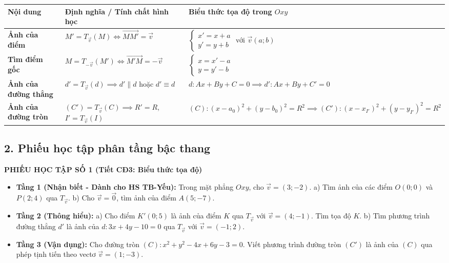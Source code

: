 \documentclass[12pt, a4paper]{article}
\renewcommand{\vec}[1]{\overrightarrow{#1}}
\begin{document}
\begin{center}  
\small  
\begin{tabularx}{\textwidth}{|p{3.2cm}|X|X|}  
\hline  
\textbf{Nội dung} & \textbf{Định nghĩa / Tính chất hình học} & \textbf{Biểu thức tọa độ trong $Oxy$} \\ \hline  
\textbf{Ảnh của điểm} & $M' = T_{\vec{v}}(M) \iff \vec{MM'} = \vec{v}$ & $\begin{cases} x' = x + a \\ y' = y + b \end{cases}$ với $\vec{v}(a; b)$ \\ \hline  
\textbf{Tìm điểm gốc} & $M = T_{-\vec{v}}(M') \iff \vec{M'M} = -\vec{v}$ & $\begin{cases} x = x' - a \\ y = y' - b \end{cases}$ \\ \hline  
\textbf{Ảnh của đường thẳng} & $d' = T_{\vec{v}}(d) \implies d' \parallel d$ hoặc $d' \equiv d$ & $d: Ax + By + C = 0 \implies d': Ax + By + C' = 0$ \\ \hline  
\textbf{Ảnh của đường tròn} & $(C') = T_{\vec{v}}(C) \implies R' = R$, $I' = T_{\vec{v}}(I)$ & $(C): (x-a_0)^2 + (y-b_0)^2 = R^2 \implies (C'): (x-x_{I'})^2 + (y-y_{I'})^2 = R^2$ \\ \hline  
\end{tabularx}  
\end{center}  
  
\subsection*{2. Phiếu học tập phân tầng bậc thang}  
  
\noindent \textbf{PHIẾU HỌC TẬP SỐ 1 (Tiết CĐ3: Biểu thức tọa độ)}  
\begin{itemize}[leftmargin=0.6cm]  
    \item \textbf{Tầng 1 (Nhận biết - Dành cho HS TB-Yếu):}  
    Trong mặt phẳng $Oxy$, cho $\vec{v} = (3; -2)$.  
    a) Tìm ảnh của các điểm $O(0; 0)$ và $P(2; 4)$ qua $T_{\vec{v}}$.  
    b) Cho $\vec{v} = \vec{0}$, tìm ảnh của điểm $A(5; -7)$.  
    \item \textbf{Tầng 2 (Thông hiểu):}  
    a) Cho điểm $K'(0; 5)$ là ảnh của điểm $K$ qua $T_{\vec{v}}$ với $\vec{v} = (4; -1)$. Tìm tọa độ $K$.  
    b) Tìm phương trình đường thẳng $d'$ là ảnh của $d: 3x + 4y - 10 = 0$ qua $T_{\vec{v}}$ với $\vec{v} = (-1; 2)$.  
    \item \textbf{Tầng 3 (Vận dụng):}  
    Cho đường tròn $(C): x^2 + y^2 - 4x + 6y - 3 = 0$. Viết phương trình đường tròn $(C')$ là ảnh của $(C)$ qua phép tịnh tiến theo vectơ $\vec{v} = (1; -3)$.  
\end{itemize}  
  
\end{document}
